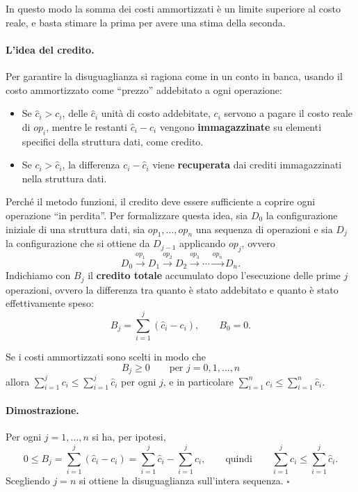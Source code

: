 In questo modo la somma dei costi ammortizzati è un limite superiore al costo reale, e basta stimare la prima per avere una stima della seconda.

\paragraph{L'idea del credito.}
Per garantire la disuguaglianza si ragiona come in un conto in banca, usando il costo ammortizzato come ``prezzo'' addebitato a ogni operazione:
\begin{itemize}
    \item Se $\hat{c}_i > c_i$, delle $\hat{c}_i$ unità di costo addebitate, $c_i$ servono a pagare il costo reale di $op_i$, mentre le restanti $\hat{c}_i - c_i$ vengono \textbf{immagazzinate} su elementi specifici della struttura dati, come credito.
    \item Se $c_i > \hat{c}_i$, la differenza $c_i - \hat{c}_i$ viene \textbf{recuperata} dai crediti immagazzinati nella struttura dati.
\end{itemize}
Perché il metodo funzioni, il credito deve essere sufficiente a coprire ogni operazione ``in perdita''. Per formalizzare questa idea, sia $D_0$ la configurazione iniziale di una struttura dati, sia $op_1,\dots,op_n$ una sequenza di operazioni e sia $D_{j}$ la configurazione che si ottiene da $D_{j-1}$ applicando $op_{j}$, ovvero
\[
D_0 \xrightarrow{op_1} D_1 \xrightarrow{op_2} D_2 \xrightarrow{op_3} \cdots \xrightarrow{op_n} D_n.
\]
Indichiamo con $B_j$ il \textbf{credito totale} accumulato dopo l'esecuzione delle prime $j$ operazioni, ovvero la differenza tra quanto è stato addebitato e quanto è stato effettivamente speso:
\[
B_j = \sum_{i=1}^{j} (\hat{c}_i - c_i), \qquad B_0 = 0.
\]

\begin{lemma}\label{lem:accantonamenti}
Se i costi ammortizzati sono scelti in modo che
\[
B_j \ge 0 \qquad \text{per } j = 0, 1, \dots, n
\]
allora $\sum_{i=1}^{j} c_i \le \sum_{i=1}^{j} \hat{c}_i$ per ogni $j$, e in particolare $\sum_{i=1}^{n} c_i \le \sum_{i=1}^{n} \hat{c}_i$.
\end{lemma}

\paragraph{Dimostrazione.}
Per ogni $j = 1,\dots,n$ si ha, per ipotesi,
\[
0 \le B_j = \sum_{i=1}^{j} (\hat{c}_i - c_i) = \sum_{i=1}^{j} \hat{c}_i - \sum_{i=1}^{j} c_i, \qquad \text{quindi} \qquad \sum_{i=1}^{j} c_i \le \sum_{i=1}^{j} \hat{c}_i.
\]
Scegliendo $j = n$ si ottiene la disuguaglianza sull'intera sequenza. \hfill $\square$


